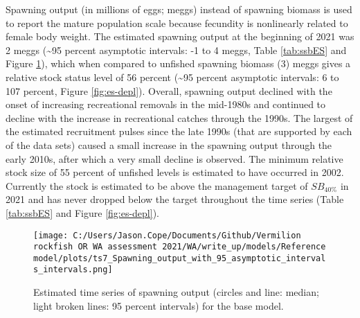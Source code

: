 \documentclass[11pt,
  english,
  a4paper,
]{article}
\begin{document}
\leavevmode\tagmcend\tagstructend


Spawning output (in millions of eggs; meggs) instead of spawning biomass is used to report the mature population scale because fecundity is nonlinearly related to female body weight. The estimated spawning output at the beginning of 2021 was 2 meggs (\textasciitilde95 percent asymptotic intervals: -1 to 4 meggs, Table \ref{tab:ssbES} and Figure \ref{fig:es-ssb}), which when compared to unfished spawning biomass (3) meggs gives a relative stock status level of 56 percent (\textasciitilde95 percent asymptotic intervals: 6 to 107 percent, Figure \ref{fig:es-depl}). Overall, spawning output declined with the onset of increasing recreational removals in the mid-1980s and continued to decline with the increase in recreational catches through the 1990s. The largest of the estimated recruitment pulses since the late 1990s (that are supported by each of the data sets) caused a small increase in the spawning output through the early 2010s, after which a very small decline is observed. The minimum relative stock size of 55 percent of unfished levels is estimated to have occurred in 2002. Currently the stock is estimated to be above the management target of {\(SB_{40\%}\)\leavevmode\tagmcend\tagstructend} in 2021 and has never dropped below the target throughout the time series (Table \ref{tab:ssbES} and Figure \ref{fig:es-depl}).

\leavevmode\tagmcend\tagstructend\par




\begin{figure}
\centering
\texttt{[image: C:/Users/Jason.Cope/Documents/Github/Vermilion rockfish OR WA assessment 2021/WA/write\_up/models/Reference model/plots/ts7\_Spawning\_output\_with\_95\_asymptotic\_intervals\_intervals.png]}
\caption{Estimated time series of spawning output (circles and line: median; light broken lines: 95 percent intervals) for the base model.\label{fig:es-ssb}}
\end{figure}

\tagmcend\tagstructend
\end{document}
